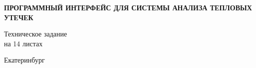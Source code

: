 \begin{titlepage}
\begin{center}
	\par \vspace{1cm}
	\begin{Large}
		\textbf{ПРОГРАММНЫЙ ИНТЕРФЕЙС ДЛЯ СИСТЕМЫ АНАЛИЗА ТЕПЛОВЫХ УТЕЧЕК}
	\end{Large}

	\begin{center}	
			Техническое задание \\
			на 14 листах
	\end{center}







	\par
	\vspace{6cm}

	\noindent Екатеринбург\\
	\\
\end{center}
\end{titlepage}
